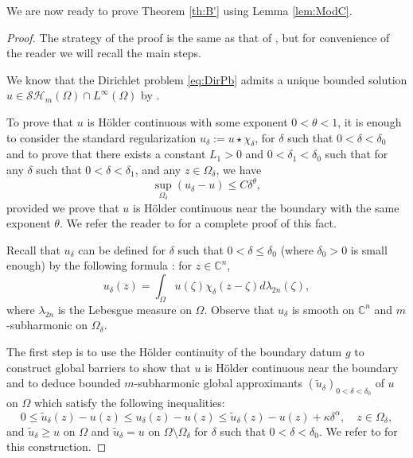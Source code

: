 \documentclass[11pt]{article}
\providecommand{\C}{}
\numberwithin{equation}{section}
\theoremstyle{definition}
\renewcommand{\C}{\mathbb{C}}
\theoremstyle{plain}
\theoremstyle{definition}
\begin{document}
We are now ready to prove Theorem \ref{th:B'} using Lemma \ref{lem:ModC}.

\begin{proof} The strategy of the proof is the same as that of \cite[Th.\,B]{BZ20}, but for convenience of the reader we will recall the main steps.

We know that the Dirichlet problem \eqref{eq:DirPb} admits a unique bounded solution $u \in \mathcal{SH}_m (\Omega) \cap L^{\infty} (\Omega)$ by \cite{N13}.

To prove that $u$ is Hölder continuous with some exponent $0 < \theta < 1$, it is enough to consider the standard regularization $u_\delta := u \star \chi_\delta$, for $\delta$ such that $0 < \delta < \delta_0$ and to prove that there exists a constant $L_1 > 0$ and $0< \delta_1 < \delta_0$ such that for any $\delta$ such that $0 < \delta < \delta_1$, and any $z \in \Omega_\delta$, we have
\begin{equation} \label{eq:Holdercontinous}
\sup_{\Omega_\delta} (u_\delta - u) \leq C \delta^{\theta},
\end{equation}
provided we prove that $u$ is Hölder continuous near the boundary with the same exponent $\theta$. We refer the reader to \cite{Ze20} for a complete proof of this fact.

Recall that $u_\delta$ can be defined for $\delta$ such that $0 < \delta \leq \delta_0$ (where $\delta_0 >0$ is small enough) by the following formula : for $z \in \C^n$,
\[
u_\delta (z) = \int_{\Omega} u (\zeta) \chi_\delta (z-\zeta) d \lambda_{2 n} (\zeta),
\]
where $\lambda_{2 n}$ is the Lebesgue measure on $\Omega$.
Observe that $u_\delta $ is smooth on $\C^n$ and $m$-subharmonic on $\Omega_\delta$.

The first step is to use the Hölder continuity of the boundary datum $g$ to construct global barriers to show that $u$ is Hölder continuous near the boundary and to deduce bounded $m$-subharmonic global approximants $(\tilde u_\delta)_{0 < \delta < \delta_0}$ of $u$ on $\Omega$ which satisfy the following inequalities:
\begin{equation} \label{eq:bestapproximant}
0 \leq \tilde{u}_{\delta}(z) - u (z) \leq u_\delta (z) - u (z) \leq \tilde{u}_{\delta}(z) - u (z) + \kappa \delta^\alpha, \quad z\in \Omega_{\delta},
\end{equation}
and $ \tilde{u}_{\delta} \geq u$ on $ \Omega$ and $\tilde{u}_{\delta} = u$ on $\Omega \setminus \Omega_\delta$ for $\delta$ such that $0 < \delta < \delta_0$.
We refer to \cite{BZ20} for this construction.


\end{proof}
\end{document}
